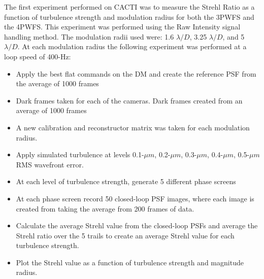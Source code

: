 The first experiment performed on CACTI was to measure the Strehl Ratio as a function of turbulence strength and modulation radius for both the 3PWFS and the 4PWFS.  This experiment was performed using the Raw Intensity signal handling method. The modulation radii used were: 1.6 $\lambda/D$, 3.25 $\lambda/D$, and 5 $\lambda/D$. At each modulation radius the following experiment was performed at a loop speed of 400-Hz:

\begin{itemize}
    \item Apply the best flat commands on the DM and create the reference PSF from the average of 1000 frames
    \item Dark frames taken for each of the cameras. Dark frames created from an average of 1000 frames
    \item A new calibration and reconstructor matrix was taken for each modulation radius.
    \item Apply simulated turbulence at levels 0.1-$\mu m$, 0.2-$\mu m$, 0.3-$\mu m$, 0.4-$\mu m$, 0.5-$\mu m$ RMS wavefront error. 
    \item At each level of turbulence strength, generate 5 different phase screens
    \item At each phase screen record 50 closed-loop PSF images, where each image is created from taking the average from 200 frames of data. 
    \item Calculate the average Strehl value from the closed-loop PSFs and average the Strehl ratio over the 5 trails to create an average Strehl value for each turbulence strength.
    \item Plot the Strehl value as a function of turbulence strength and magnitude radius. 
    

\end{itemize}




